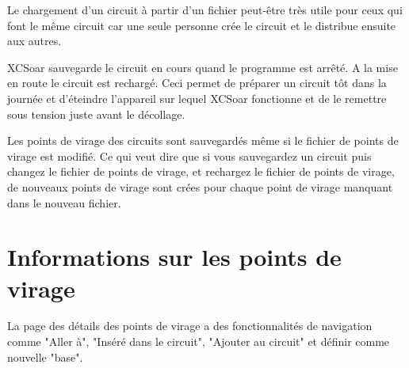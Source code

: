 \tip Le chargement d'un circuit à partir d'un fichier peut-être très utile pour ceux qui font le même circuit car une seule personne crée le circuit et le distribue ensuite aux autres.

XCSoar sauvegarde le circuit en cours quand le programme est arrêté. A la mise en route le circuit est rechargé. Ceci permet de préparer un circuit tôt dans la journée et d'éteindre l'appareil sur lequel XCSoar fonctionne et de le remettre sous tension juste avant le décollage.

Les points de virage des circuits sont sauvegardés même si le fichier de points de virage est modifié. Ce qui veut dire que si vous sauvegardez un circuit puis changez le fichier de points de virage, et rechargez le fichier de points de virage, de nouveaux points de virage sont crées pour chaque point de virage manquant dans le nouveau fichier.

\section{Informations sur les points de virage}

La page des détails des points de virage a des fonctionnalités de navigation comme "Aller à", "Inséré dans le circuit", "Ajouter au circuit" et définir comme nouvelle "base".

